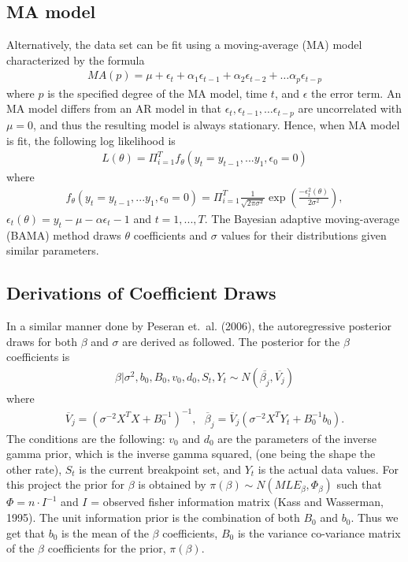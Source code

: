 \documentclass[submit]{smj}
\begin{document}
\subsection{MA model}
Alternatively, the data set can be fit using a moving-average (MA) model characterized by the formula
\begin{align*}
    MA(p) = \mu + \epsilon_t + \alpha_1 \epsilon_{t-1} + \alpha_2 \epsilon_{t-2} + \dots \alpha_{p} \epsilon_{t- p}
\end{align*}
where $p$ is the specified degree of the MA model, time $t$, and $\epsilon$ the error term. An MA model differs from an AR model in that $\epsilon_t, \epsilon_{t-1}, \dots \epsilon_{t-p}$ are uncorrelated with $\mu = 0$, and thus the resulting model is always stationary. 
Hence, when MA model is fit, the following log likelihood is 
\begin{align*}
    L(\theta) = \Pi_{i=1}^{T} f_{\theta}( y_t = y_{t-1}, ...y_1, \epsilon_0 =0)
\end{align*}
where
\begin{align*}
    f_{\theta}( y_t = y_{t-1}, ...y_1, \epsilon_0 =0) = \Pi_{i=1}^{T} \frac{1}{\sqrt{2\pi\sigma^2}}\exp{(\frac{-\epsilon_t^2(\theta)}{2\sigma^2})},
\end{align*}
$\epsilon_t(\theta) = y_t - \mu - \alpha\epsilon_t-1$ and $t=1, ... , T$. The Bayesian adaptive moving-average (BAMA) method draws $\theta$ coefficients and $\sigma$ values for their distributions given similar parameters.

\subsection{Derivations of Coefficient Draws}
In a similar manner done by Peseran et.~al. (2006), the autoregressive posterior draws for both $\beta$ and $\sigma$ are derived as followed.  The posterior for the $\beta$ coefficients is 
\begin{align*}
\beta | \sigma^2, b_0, B_0, v_0, d_0 , S_{t}, Y_{t} \sim N( \overline{\beta_j } , \overline{V_j} )
\end{align*}
where 
\begin{align*}
\overline{V}_j = (\sigma^{-2}X^T X + B_0^{-1})^{-1}, \ \ \  \overline{\beta}_j = \overline{V}_j(\sigma^{-2} X^T Y_t + B_0^{-1}b_0).
\end{align*}
The conditions are the following:  $v_0$ and $d_0$ are the parameters of the inverse gamma prior, which is the inverse gamma squared, (one being the shape the other rate), $S_t$ is the current breakpoint set, and $Y_t$ is the actual data values. For this project the prior for $\beta$ is obtained by  $\pi(\beta) \sim N(MLE_{\beta}, \Phi_{\beta})$ such that $\Phi = n \cdot I^{-1}$ and $I$ = observed fisher information matrix (Kass and Wasserman, 1995). The unit information prior is the combination of both $B_0$ and $b_0$. Thus we get that $b_0$ is the mean of the $\beta$ coefficients, $B_0$ is the variance co-variance matrix of the $\beta$ coefficients for the prior, $\pi(\beta)$. 
\end{document}
